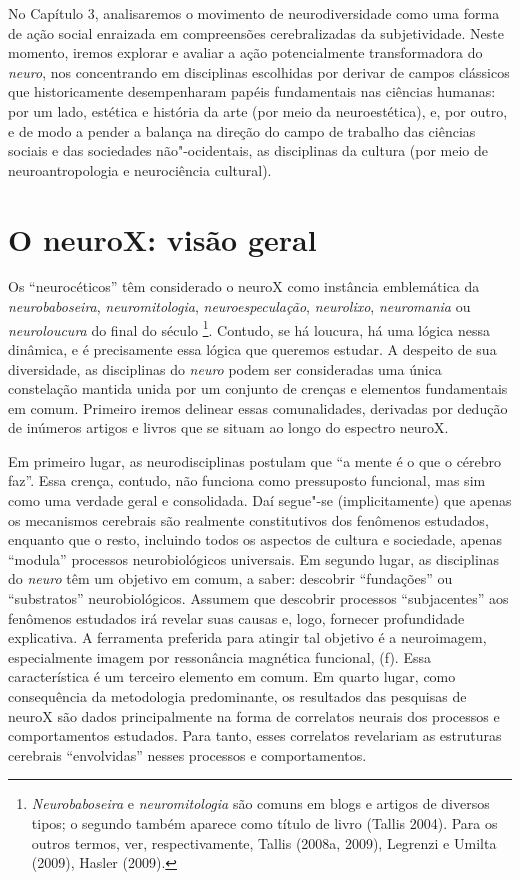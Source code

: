 No Capítulo 3, analisaremos o movimento de neurodiversidade como uma
forma de ação social enraizada em compreensões cerebralizadas da
subjetividade. Neste momento, iremos explorar e avaliar a ação
potencialmente transformadora do \emph{neuro}, nos concentrando em
disciplinas escolhidas por derivar de campos clássicos que
historicamente desempenharam papéis fundamentais nas ciências humanas:
por um lado, estética e história da arte (por meio da neuroestética), e,
por outro, e de modo a pender a balança na direção do campo de trabalho
das ciências sociais e das sociedades não"-ocidentais, as disciplinas da
cultura (por meio de neuroantropologia e neurociência cultural).

\section{O neuroX: visão geral}

Os ``neurocéticos'' têm considerado o neuroX como instância emblemática
da \emph{neurobaboseira}, \emph{neuromitologia},
\emph{neuroespeculação}, \emph{neurolixo}, \emph{neuromania} ou
\emph{neuroloucura} do final do século \footnote[2]{\emph{Neurobaboseira} e \emph{neuromitologia} são comuns em blogs e
artigos de diversos tipos; o segundo também aparece como título de livro
(Tallis 2004). Para os outros termos, ver, respectivamente, Tallis
(2008a, 2009), Legrenzi e Umilta (2009), Hasler (2009).}. Contudo,
se há loucura, há uma lógica nessa dinâmica, e é precisamente essa
lógica que queremos estudar. A despeito de sua diversidade, as
disciplinas do \emph{neuro} podem ser consideradas uma única constelação
mantida unida por um conjunto de crenças e elementos fundamentais em
comum. Primeiro iremos delinear essas comunalidades, derivadas por
dedução de inúmeros artigos e livros que se situam ao longo do espectro
neuroX.

Em primeiro lugar, as neurodisciplinas postulam que ``a mente é o que o
cérebro faz''. Essa crença, contudo, não funciona como pressuposto
funcional, mas sim como uma verdade geral e consolidada. Daí segue"-se
(implicitamente) que apenas os mecanismos cerebrais são realmente
constitutivos dos fenômenos estudados, enquanto que o resto, incluindo
todos os aspectos de cultura e sociedade, apenas ``modula'' processos
neurobiológicos universais. Em segundo lugar, as disciplinas do
\emph{neuro} têm um objetivo em comum, a saber: descobrir ``fundações''
ou ``substratos'' neurobiológicos. Assumem que descobrir processos
``subjacentes'' aos fenômenos estudados irá revelar suas causas e, logo,
fornecer profundidade explicativa. A ferramenta preferida para atingir
tal objetivo é a neuroimagem, especialmente imagem por ressonância
magnética funcional, (f). Essa característica é um terceiro elemento
em comum. Em quarto lugar, como consequência da metodologia
predominante, os resultados das pesquisas de neuroX são dados
principalmente na forma de correlatos neurais dos processos e
comportamentos estudados. Para tanto, esses correlatos revelariam as
estruturas cerebrais ``envolvidas'' nesses processos e comportamentos.

